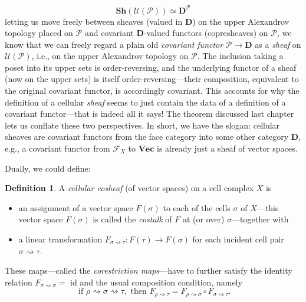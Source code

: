 \documentclass[a4paper]{book}
\theoremstyle{definition}
\theoremstyle{definition}
\newtheorem{definition}{Definition}[section]
\theoremstyle{definition}
\theoremstyle{theorem}
\theoremstyle{definition}
\begin{document}
\begin{equation*}
\textbf{Sh}(\mathcal{U}(\mathcal{P})) \simeq \textbf{D}^{\mathcal{P}}
\end{equation*} 
letting us move freely between sheaves (valued in $\textbf{D}$) on the upper Alexandrov topology placed on $\mathcal{P}$ and covariant $\textbf{D}$-valued functors (copresheaves) on $\mathcal{P}$, we know that we can freely regard a plain old \textit{covariant functor} $\mathcal{P} \rightarrow \textbf{D}$ as a \textit{sheaf} on $\mathcal{U}(\mathcal{P})$, i.e., on the upper Alexandrov topology on $\mathcal{P}$. The inclusion taking a poset into its upper sets is order-reversing, and the underlying functor of a sheaf (now on the upper sets) is itself order-reversing---their composition, equivalent to the original covariant functor, is accordingly covariant. This accounts for why the definition of a cellular \textit{sheaf} seems to just contain the data of a definition of a covariant functor---that is indeed all it says! The theorem discussed last chapter lets us conflate these two perspectives. In short, we have the slogan: cellular sheaves are covariant functors from the face category into some other category \textbf{D}, e.g., a covariant functor from $\mathcal{F}_X$ to $\textbf{Vec}$ is already just a sheaf of vector spaces. \par    
Dually, we could define: 
	\begin{definition}
		A \textit{cellular cosheaf} (of vector spaces) on a cell complex $X$ is 
		\begin{itemize}
			\item an assignment of a vector space $F(\sigma)$ to each of the cells $\sigma$ of $X$---this vector space $F(\sigma)$ is called the \textit{costalk} of $F$ at (or over) $\sigma$---together with 
			\item a linear transformation $F_{\sigma \rightsquigarrow \tau}: F(\tau) \rightarrow F(\sigma)$ for each incident cell pair $\sigma \rightsquigarrow \tau$. 
		\end{itemize}
		These maps---called the \textit{corestriction maps}---have to further satisfy the identity relation $F_{\sigma \rightsquigarrow \sigma} = $ id and the usual composition condition, namely
		\begin{equation*}
		\text{ if } \rho \rightsquigarrow \sigma \rightsquigarrow \tau , \text{ then } F_{\rho \rightsquigarrow \tau} = F_{\rho \rightsquigarrow \sigma} \circ F_{\sigma \rightsquigarrow \tau}. 
		\end{equation*}
	\end{definition}
\end{document}
